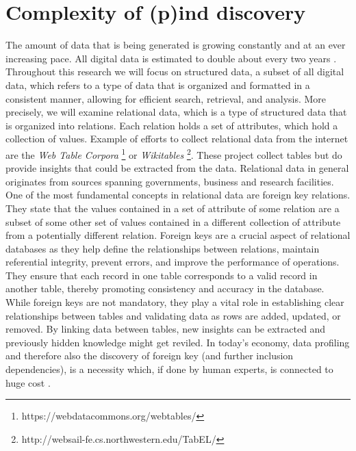 \section{Complexity of (p)ind discovery}
The amount of data that is being generated is growing constantly and at an ever increasing pace. All digital data is estimated to double about every two years \cite{gantz2012digital}. Throughout this research we will focus on structured data, a subset of all digital data, which refers to a type of data that is organized and formatted in a consistent manner, allowing for efficient search, retrieval, and analysis. More precisely, we will examine relational data, which is a type of structured data that is organized into relations. Each relation holds a set of attributes, which hold a collection of values. Example of efforts to collect relational data from the internet are the \textit{Web Table Corpora} \footnote{https://webdatacommons.org/webtables/} or \textit{Wikitables} \footnote{http://websail-fe.cs.northwestern.edu/TabEL/}. These project collect tables but do provide insights that could be extracted from the data. Relational data in general originates from sources spanning governments, business and research facilities. \\
One of the most fundamental concepts in relational data are foreign key relations\cite{casanova1982inclusion}. They state that the values contained in a set of attribute of some relation are a subset of some other set of values contained in a different collection of attribute from a potentially different relation. Foreign keys are a crucial aspect of relational databases as they help define the relationships between relations, maintain referential integrity, prevent errors, and improve the performance of operations. They ensure that each record in one table corresponds to a valid record in another table, thereby promoting consistency and accuracy in the database. While foreign keys are not mandatory, they play a vital role in establishing clear relationships between tables and validating data as rows are added, updated, or removed. By linking data between tables, new insights can be extracted and previously hidden knowledge might get reviled. In today's economy, data profiling and therefore also the discovery of foreign key (and further inclusion dependencies), is a necessity which, if done by human experts, is connected to huge cost \cite{halevy2006data}.\\

